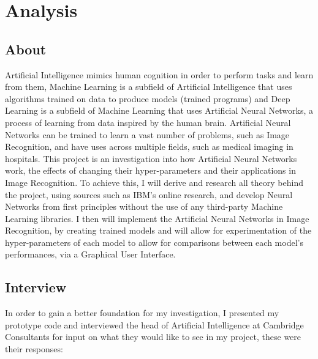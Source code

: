 \documentclass[./project-report/src/latex/project-report.tex]{subfiles}
\begin{document}
\maketitle

\clearpage
\section{Analysis}

\subsection{About}

Artificial Intelligence mimics human cognition in order to perform tasks and learn from them, Machine Learning is a subfield of Artificial Intelligence that uses 
algorithms trained on data to produce models (trained programs) and Deep Learning is a subfield of Machine Learning that uses Artificial Neural Networks, a process of 
learning from data inspired by the human brain. Artificial Neural Networks can be trained to learn a vast number of problems, such as Image Recognition, and have uses 
across multiple fields, such as medical imaging in hospitals. This project is an investigation into how Artificial Neural Networks work, the effects of changing their 
hyper-parameters and their applications in Image Recognition. To achieve this, I will derive and research all theory behind the project, using sources such as IBM's online 
research, and develop Neural Networks from first principles without the use of any third-party Machine Learning libraries. I then will implement the Artificial Neural 
Networks in Image Recognition, by creating trained models and will allow for experimentation of the hyper-parameters of each model to allow for comparisons between each 
model's performances, via a Graphical User Interface.

\subsection{Interview}

In order to gain a better foundation for my investigation, I presented my prototype code and interviewed the head of Artificial Intelligence at Cambridge Consultants 
for input on what they would like to see in my project, these were their responses:
\end{document}
